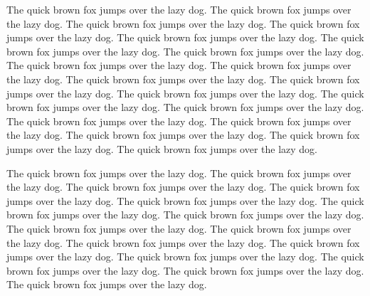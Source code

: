\documentclass{refcard}
\begin{document}
The quick brown fox jumps over the lazy dog.
The quick brown fox jumps over the lazy dog.
The quick brown fox jumps over the lazy dog.
The quick brown fox jumps over the lazy dog.
The quick brown fox jumps over the lazy dog.
The quick brown fox jumps over the lazy dog.
The quick brown fox jumps over the lazy dog.
The quick brown fox jumps over the lazy dog.
The quick brown fox jumps over the lazy dog.
The quick brown fox jumps over the lazy dog.
The quick brown fox jumps over the lazy dog.
The quick brown fox jumps over the lazy dog.
The quick brown fox jumps over the lazy dog.
The quick brown fox jumps over the lazy dog.
The quick brown fox jumps over the lazy dog.
The quick brown fox jumps over the lazy dog.
The quick brown fox jumps over the lazy dog.
The quick brown fox jumps over the lazy dog.
The quick brown fox jumps over the lazy dog.

The quick brown fox jumps over the lazy dog.
The quick brown fox jumps over the lazy dog.
The quick brown fox jumps over the lazy dog.
The quick brown fox jumps over the lazy dog.
The quick brown fox jumps over the lazy dog.
The quick brown fox jumps over the lazy dog.
The quick brown fox jumps over the lazy dog.
The quick brown fox jumps over the lazy dog.
The quick brown fox jumps over the lazy dog.
The quick brown fox jumps over the lazy dog.
The quick brown fox jumps over the lazy dog.
The quick brown fox jumps over the lazy dog.
The quick brown fox jumps over the lazy dog.
The quick brown fox jumps over the lazy dog.
The quick brown fox jumps over the lazy dog.
\end{document}
